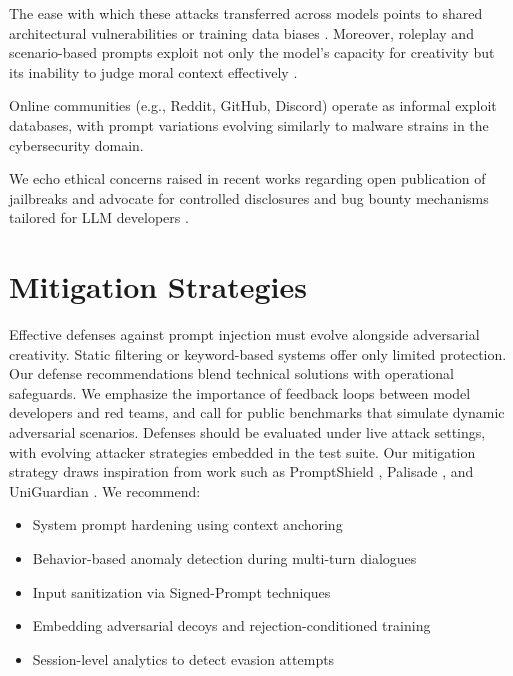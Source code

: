 \documentclass[conference]{IEEEtran}
\begin{document}
The ease with which these attacks transferred across models points to shared architectural vulnerabilities or training data biases \cite{liu2024automatic3}\cite{formalizing6}\cite{anthropicjail18}. Moreover, roleplay and scenario-based prompts exploit not only the model’s capacity for creativity but its inability to judge moral context effectively \cite{liu2024jailbreaking2}\cite{chen2025defenseprompt9}\cite{debenedetti2025defeating14}.

Online communities (e.g., Reddit, GitHub, Discord) operate as informal exploit databases, with prompt variations evolving similarly to malware strains in the cybersecurity domain.

We echo ethical concerns raised in recent works regarding open publication of jailbreaks \cite{wang2025manipulating19}\cite{xue2023trojllm20} and advocate for controlled disclosures and bug bounty mechanisms tailored for LLM developers \cite{hackett2025bypassing15}\cite{brundage2020trustworthy24}.


\section{Mitigation Strategies}

Effective defenses against prompt injection must evolve alongside adversarial creativity. Static filtering or keyword-based systems offer only limited protection. Our defense recommendations blend technical solutions with operational safeguards. We emphasize the importance of feedback loops between model developers and red teams, and call for public benchmarks that simulate dynamic adversarial scenarios. Defenses should be evaluated under live attack settings, with evolving attacker strategies embedded in the test suite.
\newline
\newline
Our mitigation strategy draws inspiration from work such as PromptShield \cite{jacob2025promptshield21}, Palisade \cite{kokkula2024palisade10}, and UniGuardian \cite{lin2025uniguardianunified13}. We recommend:
\begin{itemize}
    \item System prompt hardening using context anchoring \cite{debenedetti2025defeating14}
    \item Behavior-based anomaly detection during multi-turn dialogues \cite{hung2025attentiontracker8} \cite{chen2025secaligndefend11}\cite{anthropicjail18}
    \item Input sanitization via Signed-Prompt techniques \cite{suo2024signedprompt41}
    \item Embedding adversarial decoys and rejection-conditioned training \cite{hung2025attentiontracker8}\cite{zhang2024goalguided12}\cite{peng2024playing42}
    \item Session-level analytics to detect evasion attempts \cite{chen2025secaligndefend11}
\end{itemize}  
\end{document}
